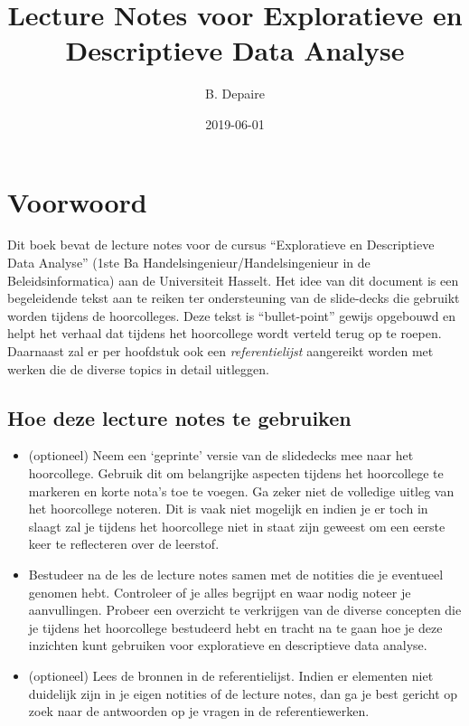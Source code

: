 \documentclass[]{memoir}
\title{Lecture Notes voor Exploratieve en Descriptieve Data Analyse}
\author{B. Depaire}
\date{2019-06-01}
\providecommand{\tightlist}{%
  \setlength{\itemsep}{0pt}\setlength{\parskip}{0pt}}
\begin{document}
\maketitle

{
\hypersetup{linkcolor=black}
\setcounter{tocdepth}{1}
\tableofcontents
}
\chapter*{Voorwoord}\label{voorwoord}

Dit boek bevat de lecture notes voor de cursus ``Exploratieve en
Descriptieve Data Analyse'' (1ste Ba Handelsingenieur/Handelsingenieur
in de Beleidsinformatica) aan de Universiteit Hasselt. Het idee van dit
document is een begeleidende tekst aan te reiken ter ondersteuning van
de slide-decks die gebruikt worden tijdens de hoorcolleges. Deze tekst
is ``bullet-point'' gewijs opgebouwd en helpt het verhaal dat tijdens
het hoorcollege wordt verteld terug op te roepen. Daarnaast zal er per
hoofdstuk ook een \emph{referentielijst} aangereikt worden met werken
die de diverse topics in detail uitleggen.

\section*{Hoe deze lecture notes te
gebruiken}\label{hoe-deze-lecture-notes-te-gebruiken}

\begin{itemize}
\tightlist
\item
  (optioneel) Neem een `geprinte' versie van de slidedecks mee naar het
  hoorcollege. Gebruik dit om belangrijke aspecten tijdens het
  hoorcollege te markeren en korte nota's toe te voegen. Ga zeker niet
  de volledige uitleg van het hoorcollege noteren. Dit is vaak niet
  mogelijk en indien je er toch in slaagt zal je tijdens het hoorcollege
  niet in staat zijn geweest om een eerste keer te reflecteren over de
  leerstof.
\item
  Bestudeer na de les de lecture notes samen met de notities die je
  eventueel genomen hebt. Controleer of je alles begrijpt en waar nodig
  noteer je aanvullingen. Probeer een overzicht te verkrijgen van de
  diverse concepten die je tijdens het hoorcollege bestudeerd hebt en
  tracht na te gaan hoe je deze inzichten kunt gebruiken voor
  exploratieve en descriptieve data analyse.
\item
  (optioneel) Lees de bronnen in de referentielijst. Indien er elementen
  niet duidelijk zijn in je eigen notities of de lecture notes, dan ga
  je best gericht op zoek naar de antwoorden op je vragen in de
  referentiewerken.
\end{itemize}
\end{document}
